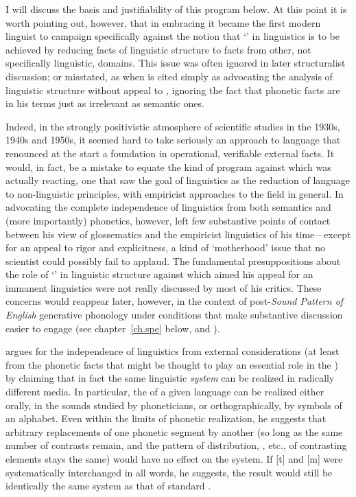 I will discuss the basis and justifiability of this program below. At
this point it is worth pointing out, however, that in embracing it
{\Hjelmslev} became the first modern linguist to campaign specifically
against the notion that `' in linguistics is to be achieved
by reducing facts of linguistic structure to facts from other, not
specifically linguistic, domains. This issue was often ignored in
later structuralist discussion; or misstated, as when {\Hjelmslev} is
cited simply as advocating the analysis of linguistic structure
without appeal to , ignoring the fact that phonetic facts are
in his terms just as irrelevant as semantic ones.

Indeed, in the strongly positivistic atmosphere of scientific studies
in the 1930s, 1940s and 1950s, it seemed hard to take seriously an
approach to language that renounced at the start a foundation in
operational, verifiable external facts. It would, in fact, be a
mistake to equate the kind of program against which {\Hjelmslev} was
actually reacting, one that saw the goal of linguistics as the
reduction of language to non-linguistic principles, with empiricist
approaches to the field in general. In advocating the complete
independence of linguistics from both semantics and (more importantly)
phonetics, however, {\Hjelmslev} left few substantive points of contact
between his view of glossematics and the empiricist linguistics of his
time—except for an appeal to rigor and explicitness, a kind of
`motherhood' issue that no scientist could possibly fail to
applaud. The fundamental presuppositions about the role of
`' in linguistic structure against which {\Hjelmslev} aimed
his appeal for an immanent linguistics were not really discussed by
most of his critics. These concerns would reappear later, however, in
the context of post-\textsl{Sound Pattern of English} generative
phonology under conditions that make substantive discussion easier to
engage (see chapter~\ref{ch.spe} below, and
\citealt{sra81:unnatural}).

{\Hjelmslev} argues for the independence of linguistics from external
considerations (at least from the phonetic facts that might be thought
to play an essential role in the ) by claiming that
in fact the same linguistic \emph{system} can be realized in radically
different media. In particular, the  of a given
language can be realized either orally, in the sounds studied by
phoneticians, or orthographically, by symbols of an alphabet. Even
within the limits of phonetic realization, he suggests that arbitrary
replacements of one phonetic segment by another (so long as the same
number of contrasts remain, and the pattern of distribution,
, etc., of contrasting elements stays the same) would have
no effect on the system. If [t] and [m] were systematically
interchanged in all  words, he suggests, the result would still
be identically the same system as that of standard .

